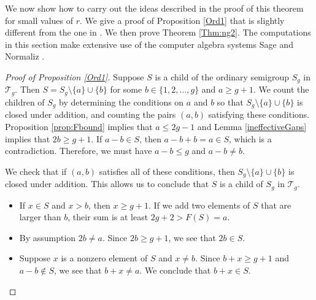 \documentclass[12pt]{amsart}
\newcommand{\T}{{\mathcal T}}
\theoremstyle{plain}\newtheorem{proposition}{Proposition}[section]
\begin{document}
We now show how to carry out the ideas described in the proof of this theorem for small values of $r$. We give a proof of Proposition \ref{Ord1} that is slightly different from the one in \cite{Bras-Amoros_ord}.  We then prove Theorem \ref{Thm:ng2}.  The computations in this section make extensive use of the computer algebra systems Sage \cite{SageMath} and Normaliz \cite{Normaliz_system}.
\begin{proof}[Proof of Proposition \ref{Ord1}]
Suppose $S$ is a child of the ordinary semigroup $S_g$ in $\T_g$.  Then $S = S_g \setminus \{a\} \cup \{b\}$ for some $b \in \{1,2,\ldots, g\}$ and $a \ge g+1$.  We count the children of $S_g$ by determining the conditions on $a$ and $b$ so that $S_g \setminus \{a\} \cup \{b\}$ is closed under addition, and counting the pairs $(a,b)$ satisfying these conditions. Proposition \ref{prop:Fbound} implies that $a \le  2g-1$ and Lemma \ref{ineffectiveGaps} implies that $2b \ge g+1$.  If $a - b \in S$, then $a-b + b  = a \in S$, which is a contradiction.  Therefore, we must have $a-b \le g$ and $a-b \neq b$. 

We check that if $(a,b)$ satisfies all of these conditions, then $S_g \setminus \{a\} \cup \{b\}$ is closed under addition.  This allows us to conclude that $S$ is a child of $S_g$ in $\T_g$.  
\begin{itemize}[leftmargin=*]
\item If $x\in S$ and $x > b$, then $x \ge g+1$.  If we add two elements of $S$ that are larger than $b$, their sum is at least $2g+2> F(S) = a$.  
\item By assumption $2b \neq a$. Since $2b \ge g+1$, we see that $2b \in S$.  
\item Suppose $x$ is a nonzero element of $S$ and $x \neq b$. Since $b+x \ge g+1$ and $a-b \not\in S$, we see that $b+x \neq a$.  We conclude that $b+x \in S$.
\end{itemize}


\end{proof}
\end{document}
